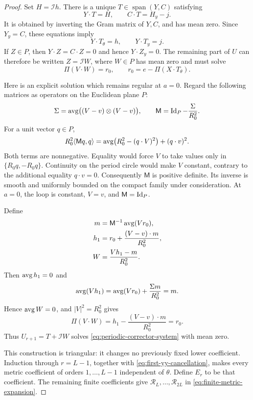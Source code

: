 \begin{proof}
Set $H=\mathcal I h$.  There is a unique
$T\in\operatorname{span}(Y,C)$ satisfying
\begin{equation}
 Y\cdot T=H,\qquad C\cdot T=H_y-j.
 \label{eq:corrector-span-part}
\end{equation}
It is obtained by inverting the Gram matrix of $Y,C$, and has mean zero.
Since $Y_y=C$, these equations imply
\[
 Y\cdot T_\theta=h,\qquad Y\cdot T_y=j.
\]
If $Z\in P$, then $Y\cdot Z=C\cdot Z=0$ and hence
$Y\cdot Z_y=0$.  The remaining part of $U$ can therefore be written
$Z=\mathcal I W$, where $W\in P$ has mean zero and must solve
\begin{equation}
 \Pi(V\cdot W)=r_0,
 \qquad r_0=e-\Pi(X\cdot T_\theta).
 \label{eq:covariance-equation}
\end{equation}

Here is an explicit solution which remains regular at $a=0$.  Regard the
following matrices as operators on the Euclidean plane $P$:
\[
 \Sigma=\operatorname{avg}\bigl((V-v)\otimes(V-v)\bigr),
 \qquad \mathsf M=\operatorname{Id}_P-\frac{\Sigma}{R_0^2}.
\]
For a unit vector $q\in P$,
\begin{equation}
 R_0^2\langle\mathsf Mq,q\rangle
   =\operatorname{avg}\bigl(R_0^2-(q\cdot V)^2\bigr)+(q\cdot v)^2.
 \label{eq:covariance-positive}
\end{equation}
Both terms are nonnegative.  Equality would force $V$ to take values only
in $\{R_0q,-R_0q\}$.  Continuity on the period circle would make $V$
constant, contrary to the additional equality $q\cdot v=0$.
Consequently $\mathsf M$ is positive definite.  Its inverse is smooth and
uniformly bounded on the compact family under consideration.  At $a=0$,
the loop is constant, $V=v$, and $\mathsf M=\operatorname{Id}_P$.

Define
\begin{equation}
 \begin{aligned}
 m&=\mathsf M^{-1}\operatorname{avg}(Vr_0),\\
 h_1&=r_0+\frac{(V-v)\cdot m}{R_0^2},\\
 W&=\frac{Vh_1-m}{R_0^2}.
 \end{aligned}
 \label{eq:covariance-solve}
\end{equation}
Then $\operatorname{avg} h_1=0$ and
\[
 \operatorname{avg}(Vh_1)=\operatorname{avg}(Vr_0)+\frac{\Sigma m}{R_0^2}=m.
\]
Hence $\operatorname{avg} W=0$, and $|V|^2=R_0^2$ gives
\[
 \Pi(V\cdot W)=h_1-\frac{(V-v)\cdot m}{R_0^2}=r_0.
\]
Thus $U_{r+1}=T+\mathcal I W$ solves
\eqref{eq:periodic-corrector-system} with mean zero.

This construction is triangular: it changes no previously fixed lower
coefficient.  Induction through $r=L-1$, together with
\eqref{eq:first-yy-cancellation}, makes every metric coefficient of orders
$1,\ldots,L-1$ independent of $\theta$.  Define $E_r$ to be that
coefficient.  The remaining finite coefficients give
$\mathcal R_L,\ldots,\mathcal R_{2L}$ in
\eqref{eq:finite-metric-expansion}.


\end{proof}
